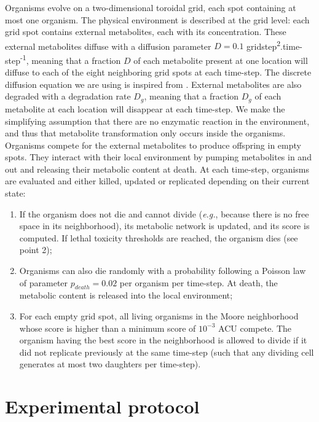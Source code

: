 Organisms evolve on a two-dimensional toroidal grid, each spot containing at most one organism. The physical environment is described at the grid level: each grid spot contains external metabolites, each with its concentration.
These external metabolites diffuse with a diffusion parameter $D=0.1$ gridstep\textsuperscript{2}.time-step\textsuperscript{-1}, meaning that a fraction $D$ of each metabolite present at one location will diffuse to each of the eight neighboring grid spots at each time-step. The discrete diffusion equation we are using is inspired from \cite{frenoy-et-al-2013}. External metabolites are also degraded with a degradation rate $D_g$, meaning that a fraction $D_g$ of each metabolite at each location will disappear at each time-step. We make the simplifying assumption that there are no enzymatic reaction in the environment, and thus that metabolite transformation only occurs inside the organisms. Organisms compete for the external metabolites to produce offspring in empty spots. They interact with their local environment by pumping metabolites in and out and releasing their metabolic content at death. At each time-step, organisms are evaluated and either killed, updated or replicated depending on their current state:
\begin{enumerate}
\item If the organism does not die and cannot divide (\textit{e.g.}, because there is no free space in its neighborhood), its metabolic network is updated, and its score is computed. If lethal toxicity thresholds are reached, the organism dies (see point 2);
\item Organisms can also die randomly with a probability following a Poisson law of parameter $p_{death}=0.02$ per organism per time-step. At death, the metabolic content is released into the local environment;
\item For each empty grid spot, all living organisms in the Moore neighborhood whose score is higher than a minimum score of $10^{-3}$ ACU compete. The organism having the best score in the neighborhood is allowed to divide if it did not replicate previously at the same time-step (such that any dividing cell generates at most two daughters per time-step).
\end{enumerate}


\section{Experimental protocol}

